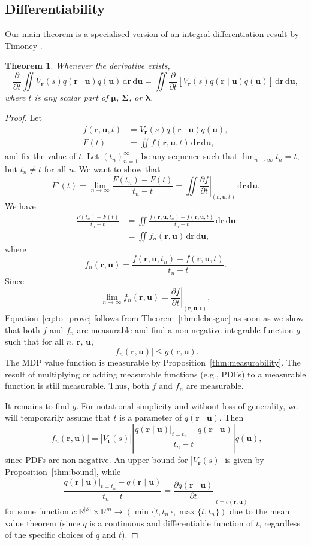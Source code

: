 \documentclass{mpaper}
\newtheorem{theorem}{Theorem}[section]
\newcommand{\V}{V_{\mathbf{r}}}
\newcommand{\dx}{\,\mathrm{d}\mathbf{r}\,\mathrm{d}\mathbf{u}}
\newcommand{\f}{f(\mathbf{r}, \mathbf{u}, t)}
\newcommand{\fn}{f_n(\mathbf{r}, \mathbf{u})}
\newcommand{\ftn}{f(\mathbf{r}, \mathbf{u}, t_n)}
\newcommand{\g}{g(\mathbf{r}, \mathbf{u})}
\newcommand{\dt}{\frac{\partial}{\partial t}}
\newcommand{\df}{\left.\frac{\partial f}{\partial t}\right|_{(\mathbf{r},
    \mathbf{u}, t)}}
\begin{document}
\subsection{Differentiability} \label{sec:the_proof}

Our main theorem is a specialised version of an integral differentiation result
by Timoney \cite{lecture_notes}.
\begin{theorem} \label{thm:main}
  Whenever the derivative exists,
  \[
    \dt\iint
    \V(s)q(\mathbf{r} \mid \mathbf{u})q(\mathbf{u})\dx
    = \iint
    \dt[\V(s)q(\mathbf{r} \mid \mathbf{u})q(\mathbf{u})]\dx,
  \]
  where $t$ is any scalar part of $\bm\mu$, $\bm\Sigma$, or $\bm\lambda$.
\end{theorem}
\begin{proof}
  Let
  \begin{align*}
    \f &= \V(s)q(\mathbf{r} \mid \mathbf{u})q(\mathbf{u}), \\
    F(t) &= \iint \f\dx,
  \end{align*}
  and fix the value of $t$. Let $(t_n)_{n=1}^\infty$ be any sequence such that
  $\lim_{n \to \infty} t_n = t$, but $t_n \ne t$ for all $n$. We want to show
  that
  \begin{equation} \label{eq:to_prove}
    F'(t) = \lim_{n \to \infty} \frac{F(t_n) - F(t)}{t_n - t} = \iint \df\dx.
  \end{equation}
  We have
  \[
    \begin{split}
      \frac{F(t_n) - F(t)}{t_n - t} &= \iint \frac{\ftn - \f}{t_n - t}\dx \\
      &= \iint \fn\dx,
    \end{split}
  \]
  where
  \[
    \fn = \frac{\ftn - \f}{t_n - t}.
  \]
  Since
  \[
    \lim_{n \to \infty} \fn = \df,
  \]
  Equation~\eqref{eq:to_prove} follows from Theorem~\ref{thm:lebesgue} as soon
  as we show that both $f$ and $f_n$ are measurable and find a non-negative
  integrable function $g$ such that for all $n$, $\mathbf{r}$, $\mathbf{u}$,
  \[
    |\fn| \le \g.
  \]
  The MDP value function is measurable by Proposition~\ref{thm:measurability}.
  The result of multiplying or adding measurable functions (e.g., PDFs) to a
  measurable function is still measurable. Thus, both $f$ and $f_n$ are
  measurable.

  It remains to find $g$. For notational simplicity and without loss of
  generality, we will temporarily assume that $t$ is a parameter of
  $q(\mathbf{r} \mid \mathbf{u})$. Then
  \[
    |\fn| = |\V(s)| \left| \frac{q(\mathbf{r} \mid \mathbf{u})|_{t =
          t_n} - q(\mathbf{r} \mid \mathbf{u})}{t_n - t} \right| q(\mathbf{u}),
  \]
  since PDFs are non-negative. An upper bound for
  $|\V(s)|$ is given by Proposition~\ref{thm:bound}, while
  \[
    \frac{q(\mathbf{r} \mid \mathbf{u})|_{t = t_n} - q(\mathbf{r} \mid
      \mathbf{u})}{t_n - t} = \left. \frac{\partial q(\mathbf{r} \mid
        \mathbf{u})}{\partial t} \right|_{t = c(\mathbf{r}, \mathbf{u})}
  \]
  for some function $c \colon \mathbb{R}^{|\mathcal{S}|} \times \mathbb{R}^m \to
  (\min\{t, t_n\}, \max\{t, t_n\})$ due to the mean value theorem (since $q$ is
  a continuous and differentiable function of $t$, regardless of the specific
  choices of $q$ and $t$).


\end{proof}
\end{document}
